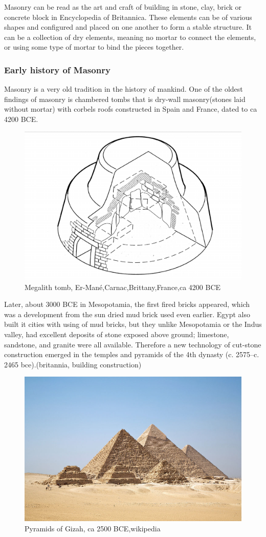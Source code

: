 Masonry can be read as the art and craft of building in stone, clay, brick or concrete block in Encyclopedia of Britannica. These elements can be of various shapes and configured and placed on one another to form a stable structure. It can be a collection of dry elements, meaning no mortar to connect the elements, or using some type of mortar to bind the pieces together. 



\subsubsection{Early history of Masonry}
Masonry is a very old tradition in the history of mankind. One of the oldest findings of masonry is  chambered tombs that is  dry-wall masonry(stones laid without mortar) with corbels roofs constructed in Spain and France, dated to ca 4200 BCE. 

\begin{figure}[H]
\centering
\includegraphics[height=0.3\linewidth ]{figure/Introduction/oldMasonry2.pdf}
\caption{Megalith tomb, Er-Mané,Carnac,Brittany,France,ca 4200 BCE}
\end{figure}

Later, about 3000 BCE in Mesopotamia, the first fired bricks appeared, which was a development from the sun dried mud brick used even earlier.
Egypt also built it cities with using of mud bricks, but they unlike Mesopotamia or the Indus valley, had excellent deposits of stone exposed above ground; limestone, sandstone, and granite were all available.
Therefore a new technology of cut-stone construction emerged in the temples and pyramids of the 4th dynasty (c. 2575–c. 2465 bce).(britannia, building construction) 

\begin{figure}[H]
\centering
\includegraphics[width=0.5\linewidth ]{figure/Introduction/GizahPyramids.jpg}
\caption{Pyramids of Gizah, ca 2500 BCE,wikipedia}
\end{figure}

